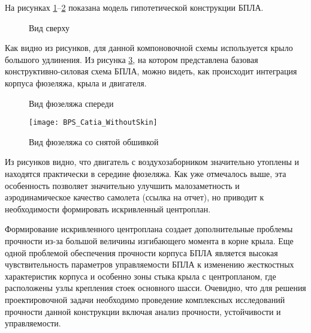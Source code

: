 На рисунках 
\ref{fig:BPS_Catia_Top}--\ref{fig:BPS_Catia_Front} показана модель гипотетической конструкции БПЛА.


\begin{figure}[H]
\centering
\def\svgwidth{0.9\textwidth}

\caption{Вид сверху}
\label{fig:BPS_Catia_Top}
\end{figure}

Как видно из рисунков, для данной компоновочной схемы используется крыло большого удлинения. Из рисунка \ref{fig:BPS_Catia_WithoutSkin}, на котором представлена базовая конструктивно-силовая схема БПЛА, можно видеть, как происходит интеграция корпуса фюзеляжа, крыла и двигателя. 

\begin{figure}[H]
\centering

\caption{Вид фюзеляжа спереди}
\label{fig:BPS_Catia_Front}
\end{figure}

\begin{figure}[H]
\centering
\texttt{[image: BPS\_Catia\_WithoutSkin]}
\caption{Вид фюзеляжа со снятой обшивкой}
\label{fig:BPS_Catia_WithoutSkin}
\end{figure}

%

Из рисунков видно, что двигатель с воздухозаборником значительно утоплены и находятся практически в середине фюзеляжа. Как уже отмечалось выше, эта особенность позволяет значительно улучшить малозаметность и аэродинамическое качество самолета (ссылка на отчет), но приводит к необходимости формировать искривленный центроплан. 

Формирование искривленного центроплана создает дополнительные проблемы прочности из-за большой величины изгибающего момента в корне крыла. Еще одной проблемой обеспечения прочности корпуса БПЛА является высокая чувствительность параметров управляемости БПЛА к изменению жесткостных характеристик корпуса и особенно зоны стыка крыла с центропланом, где расположены узлы крепления стоек основного шасси. Очевидно, что для решения проектировочной задачи необходимо проведение комплексных исследований прочности данной конструкции включая анализ прочности, устойчивости и управляемости. 

